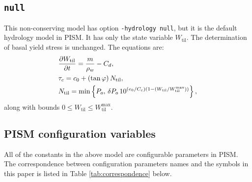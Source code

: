 \documentclass[gmd]{copernicus}   %
\newcommand{\text}{\textrm}
\newcommand{\ddt}[1]{\ensuremath{\frac{\partial #1}{\partial t}}}
\newcommand{\Wtil}{W_{\text{til}}}
\newcommand{\Wtilmax}{W_{\text{til}}^{\text{max}}}
\begin{document}
\subsection{\texttt{null}}  This non-conserving model has option \texttt{-hydrology null}, but it is the default hydrology model in PISM.  It has only the state variable $\Wtil$.  The determination of basal yield stress is unchanged.  The equations are:
\begin{align}
&\ddt{\Wtil} = \frac{m}{\rho_w} - C_d, \notag \\
&\tau_c = c_0 + (\tan \varphi)\, \Ntil, \notag \\
&\Ntil = \min\left\{P_o,\, \delta P_o \, 10^{(e_0/C_c) \left(1 - (\Wtil/\Wtilmax)\right)}\right\}, \notag
\end{align}
along with bounds $0\le \Wtil \le \Wtilmax$.

\subsection{PISM configuration variables}  All of the constants in the above model are configurable parameters in PISM.  The correspondence between configuration parameters names and the symbols in this paper is listed in Table \ref{tab:correspondence} below.
\end{document}
